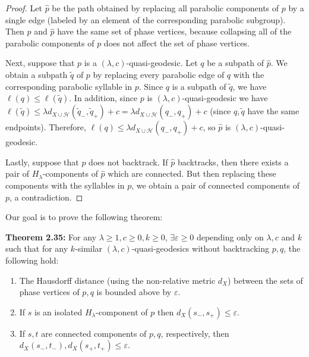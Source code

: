 \documentclass[12pt]{article}
\newcommand{\vs}{\vskip10pt}
\begin{document}
	\begin{proof}
		
		Let $\hat{p}$ be the path obtained by replacing all parabolic components of $p$ by a single edge (labeled by an element of the corresponding parabolic subgroup). Then $p$ and $\hat{p}$ have the same set of phase vertices, because collapsing all of the parabolic components of $p$ does not affect the set of phase vertices. 
		
		\vs 
		
		Next, suppose that $p$ is a $(\lambda, c)$-quasi-geodesic. Let $q$ be a subpath of $\hat{p}$. We obtain a subpath $\tilde{q}$ of $p$ by replacing every parabolic edge of $q$ with the corresponding parabolic syllable in $p$. Since $q$ is a subpath of $\tilde{q}$, we have $\ell(q) \leq \ell(\tilde{q})$. In addition, since $p$ is $(\lambda,c)$-quasi-geodesic we have $\ell(\tilde{q}) \leq \lambda d_{X \cup \mathcal{H}}(\tilde{q}_{-}, \tilde{q}_{+}) + c = \lambda d_{X \cup \mathcal{H}}(q_{-}, q_{+}) + c$ (since $q, \tilde{q}$ have the same endpoints). Therefore, $\ell(q) \leq \lambda d_{X \cup \mathcal{H}}(q_{-}, q_{+}) + c$, so $\hat{p}$ is $(\lambda, c)$-quasi-geodesic.
		
		\vs 
		
		Lastly, suppose that $p$ does not backtrack. If $\hat{p}$ backtracks, then there exists a pair of $H_{\lambda}$-components of $\hat{p}$ which are connected. But then replacing these components with the syllables in $p$, we obtain a pair of connected components of $p$, a contradiction. 
		
	\end{proof}

	Our goal is to prove the following theorem: 
	
	\vs 
	
	\textbf{Theorem 2.35: } For any $\lambda \geq 1, c \geq 0, k \geq 0$, $\exists \varepsilon \geq 0$ depending only on $\lambda, c$ and $k$ such that for any $k$-similar $(\lambda, c)$-quasi-geodesics without backtracking $p,q$, the following hold: 
	
	\begin{enumerate}[label = (\alph*)]
		\item The Hausdorff distance (using the non-relative metric $d_X$) between the sets of phase vertices of $p,q$ is bounded above by $\varepsilon$. 
		\item If $s$ is an isolated $H_{\lambda}$-component of $p$ then $d_X(s_{-}, s_{+}) \leq \varepsilon$. 
		\item If $s,t$ are connected components of $p,q$, respectively, then $d_X(s_{-}, t_{-}), d_X(s_{+}, t_{+}) \leq \varepsilon$. 
	\end{enumerate} 
\end{document}
